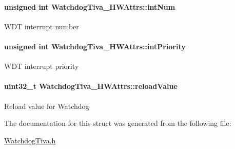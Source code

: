 \paragraph[{int\+Num}]{\setlength{\rightskip}{0pt plus 5cm}unsigned int Watchdog\+Tiva\+\_\+\+H\+W\+Attrs\+::int\+Num}\label{struct_watchdog_tiva___h_w_attrs_aebd70848c54717c57475a01618a68f50}
W\+D\+T interrupt number 
\paragraph[{int\+Priority}]{\setlength{\rightskip}{0pt plus 5cm}unsigned int Watchdog\+Tiva\+\_\+\+H\+W\+Attrs\+::int\+Priority}\label{struct_watchdog_tiva___h_w_attrs_ab4e8599de83ffca39b09a81dde07144d}
W\+D\+T interrupt priority 
\paragraph[{reload\+Value}]{\setlength{\rightskip}{0pt plus 5cm}uint32\+\_\+t Watchdog\+Tiva\+\_\+\+H\+W\+Attrs\+::reload\+Value}\label{struct_watchdog_tiva___h_w_attrs_a89674a9a8537a33a7e5ef4b94ac8f5e4}
Reload value for Watchdog 

The documentation for this struct was generated from the following file\+:\begin{DoxyCompactItemize}
\item 
\hyperlink{_watchdog_tiva_8h}{Watchdog\+Tiva.\+h}\end{DoxyCompactItemize}
